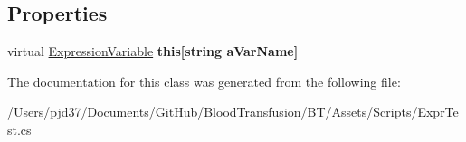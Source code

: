 \subsection*{Properties}
\begin{DoxyCompactItemize}
\item 
virtual \hyperlink{class_b83_1_1_logic_expression_parser_1_1_expression_variable}{Expression\+Variable} {\bfseries this\mbox{[}string a\+Var\+Name\mbox{]}}\hypertarget{class_b83_1_1_logic_expression_parser_1_1_expression_context_ac03ce0e2bd5042641252937f778e1b1a}{}\label{class_b83_1_1_logic_expression_parser_1_1_expression_context_ac03ce0e2bd5042641252937f778e1b1a}

\end{DoxyCompactItemize}


The documentation for this class was generated from the following file\+:\begin{DoxyCompactItemize}
\item 
/\+Users/pjd37/\+Documents/\+Git\+Hub/\+Blood\+Transfusion/\+B\+T/\+Assets/\+Scripts/Expr\+Test.\+cs\end{DoxyCompactItemize}
